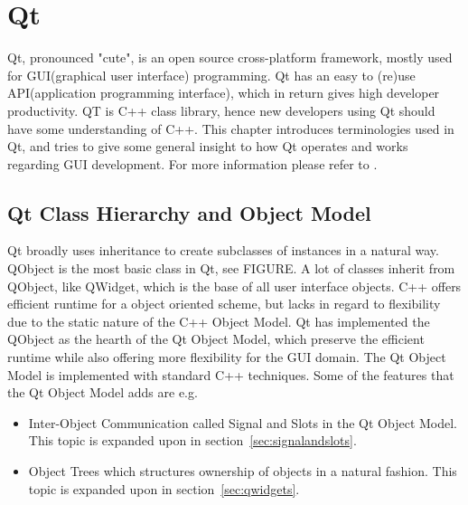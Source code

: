 \section{Qt}
Qt, pronounced "cute", is an open source cross-platform framework, mostly used for GUI(graphical user interface) programming. Qt has an easy to (re)use API(application programming interface), which in return gives high developer productivity. QT is C++ class library, hence new developers using Qt should have some understanding of C++.
This chapter introduces terminologies used in Qt, and tries to give some general insight to how Qt operates and works regarding GUI development. For more information please refer to \cite{QtDocumentation}.




\subsection{Qt Class Hierarchy and Object Model}
\label{sec:QtClassHierarchyAndObjectModel}
Qt broadly uses inheritance to create subclasses of instances in a natural way. QObject is the most basic class in Qt, see FIGURE. A lot of classes inherit from QObject, like QWidget, which is the base of all user interface objects. 
C++ offers efficient runtime for a object oriented scheme, but lacks in regard to flexibility due to the static nature of the C++ Object Model. Qt has implemented the QObject as the hearth of the Qt Object Model, which preserve the efficient runtime while also offering more flexibility for the GUI domain. The Qt Object Model is implemented with standard C++ techniques. Some of the features that the Qt Object Model adds are e.g.

\begin{itemize}
\item Inter-Object Communication called Signal and Slots in the Qt Object Model. This topic is expanded upon in section~\ref{sec:signalandslots}.
\item Object Trees which structures ownership of objects in a natural fashion. This topic is expanded upon in section~\ref{sec:qwidgets}.
\end{itemize}

